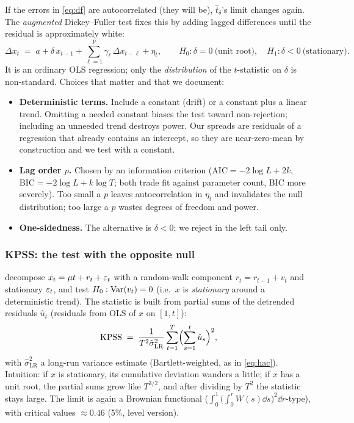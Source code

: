 If the errors in \eqref{eq:df} are autocorrelated (they will be), $\hat t_\delta$'s limit
changes again. The \emph{augmented} Dickey--Fuller test fixes this by adding lagged
differences until the residual is approximately white:
\begin{equation}
  \Delta x_t \;=\; a + \delta\,x_{t-1} + \sum_{\ell=1}^{p}\gamma_\ell\,\Delta x_{t-\ell}
  + \eta_t ,
  \qquad H_0:\delta=0\ \text{(unit root)},\quad H_1:\delta<0\ \text{(stationary)}.
  \label{eq:adf}
\end{equation}
It is an ordinary OLS regression; only the \emph{distribution} of the $t$-statistic on
$\delta$ is non-standard. Choices that matter and that we document:
\begin{itemize}
  \item \textbf{Deterministic terms.} Include a constant (drift) or a constant plus a
    linear trend. Omitting a needed constant biases the test toward non-rejection;
    including an unneeded trend destroys power. Our spreads are residuals of a regression
    that already contains an intercept, so they are near-zero-mean by construction and we
    test with a constant.
  \item \textbf{Lag order $p$.} Chosen by an information criterion
    ($\mathrm{AIC}=-2\log L+2k$, $\mathrm{BIC}=-2\log L+k\log T$; both trade fit against
    parameter count, BIC more severely). Too small a $p$ leaves autocorrelation in
    $\eta_t$ and invalidates the null distribution; too large a $p$ wastes degrees of
    freedom and power.
  \item \textbf{One-sidedness.} The alternative is $\delta<0$; we reject in the left tail
    only.
\end{itemize}

\subsubsection{KPSS: the test with the opposite null}
\label{sec:ts:kpss}

\cite{kpss1992} decompose $x_t = \mu t + r_t + \varepsilon_t$ with a random-walk
component $r_t=r_{t-1}+v_t$ and stationary $\varepsilon_t$, and test
$H_0:\operatorname{Var}(v_t)=0$ (i.e.\ $x$ is \emph{stationary} around a deterministic trend). The
statistic is built from partial sums of the detrended residuals
$\hat u_t$ (residuals from OLS of $x$ on $[1,t]$):
\begin{equation}
  \mathrm{KPSS} \;=\; \frac{1}{T^2\hat\sigma^2_{\text{LR}}}
  \sum_{t=1}^{T}\Bigl(\sum_{s=1}^{t}\hat u_s\Bigr)^{2},
  \label{eq:kpss}
\end{equation}
with $\hat\sigma^2_{\text{LR}}$ a long-run variance estimate (Bartlett-weighted, as in
\eqref{eq:hac}). Intuition: if $x$ is stationary, its cumulative deviation wanders a
little; if $x$ has a unit root, the partial sums grow like $T^{3/2}$, and after dividing
by $T^2$ the statistic stays large. The limit is again a Brownian functional
($\int_0^1\!\bigl(\int_0^r W(s)\dd s\bigr)^2\!\dd r$-type), with critical values
$\approx0.46$ (5\%, level version).

